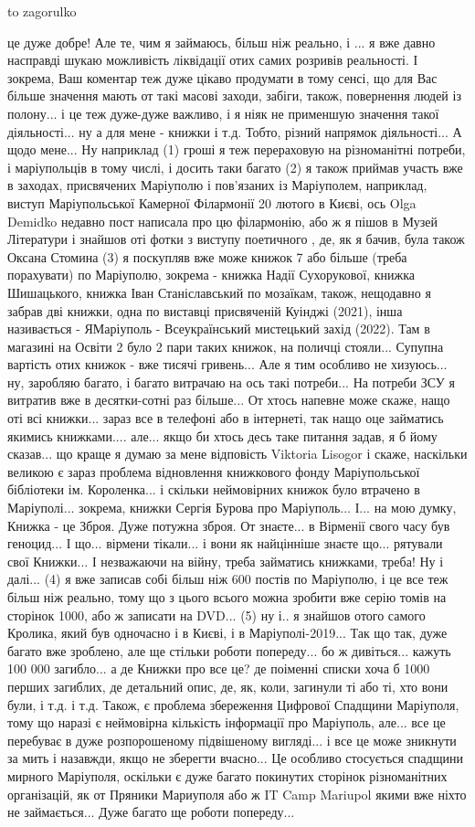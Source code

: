 to zagorulko

це дуже добре! Але те, чим я займаюсь, більш ніж реально, і ... я вже давно
насправді шукаю можливість ліквідації отих самих розривів реальності. І
зокрема, Ваш коментар теж дуже цікаво продумати в тому сенсі, що для Вас більше
значення мають от такі масові заходи, забіги, також, повернення людей із
полону... і це теж дуже-дуже важливо, і я ніяк не применшую значення такої
діяльності...  ну а для мене - книжки і т.д.  Тобто, різний напрямок
діяльності... А щодо мене... Ну наприклад (1) гроші я теж перераховую на
різноманітні потреби, і маріупольців в тому числі, і досить таки багато (2) я
також приймав участь вже в заходах, присвячених Маріуполю і пов'язаних із
Маріуполем, наприклад, виступ Маріупольської Камерної Філармонії 20 лютого в
Києві, ось Olga Demidko недавно пост написала про цю філармонію, або ж я пішов
в Музей Літератури і знайшов оті фотки з виступу поетичного , де, як я бачив,
була також Оксана Стомина (3) я поскупляв вже може книжок 7 або більше (треба
порахувати) по Маріуполю, зокрема - книжка Надії Сухорукової, книжка
Шишацького, книжка Іван Станіславський по мозаїкам, також, нещодавно я забрав
дві книжки, одна по виставці присвяченій Куінджі (2021), інша називається -
ЯМаріуполь - Всеукраїнський мистецький захід (2022). Там в магазині на Освіти 2
було 2 пари таких книжок, на поличці стояли... Супупна вартість отих книжок -
вже тисячі гривень... Але я тим особливо не хизуюсь... ну, заробляю багато, і
багато витрачаю на ось такі потреби... На потреби ЗСУ я витратив вже в
десятки-сотні раз більше... От хтось напевне може скаже, нащо оті всі книжки...
зараз все в телефоні або в інтернеті, так нащо  оце займатись якимись
книжками.... але... якщо би хтось десь таке питання задав, я б йому сказав...
що краще я думаю за мене відповість Viktoria  Lisogor і скаже, наскільки
великою є зараз проблема відновлення книжкового фонду Маріупольської бібліотеки
ім. Короленка... і скільки неймовірних книжок було втрачено в Маріуполі...
зокрема, книжки Сергія Бурова про Маріуполь... І... на мою думку, Книжка - це
Зброя. Дуже потужна зброя. От знаєте... в Вірменії свого часу був геноцид... І
що... вірмени тікали... і вони як найцінніше знаєте що... рятували свої
Книжки... І незважаючи на війну, треба займатись книжками, треба! Ну і далі...
(4) я вже записав собі більш ніж 600 постів по Маріуполю, і це все теж більш
ніж реально, тому що з цього всього можна зробити вже серію томів на сторінок
1000, або ж записати на DVD... (5) ну і.. я знайшов отого самого Кролика, який
був одночасно і в Києві, і в Маріуполі-2019... Так що так, дуже багато вже
зроблено, але ще стільки роботи попереду... бо ж дивіться... кажуть 100 000
загибло... а де Книжки про все це? де поіменні списки хоча б 1000 перших
загиблих, де детальний опис, де, як, коли, загинули ті або ті, хто вони були, і
т.д. і т.д. Також, є проблема збереження Цифрової Спадщини Маріуполя, тому що
наразі є неймовірна кількість інформації про Маріуполь, але... все це перебуває
в дуже розпорошеному підвішеному вигляді... і все це може зникнути за мить і
назавжди, якщо не зберегти вчасно... Це особливо стосується спадщини мирного
Маріуполя, оскільки є дуже багато покинутих сторінок різноманітних організацій,
як от Пряники Мариуполя або ж IT Camp Mariupol якими вже ніхто не займається...
Дуже багато ще роботи попереду...
